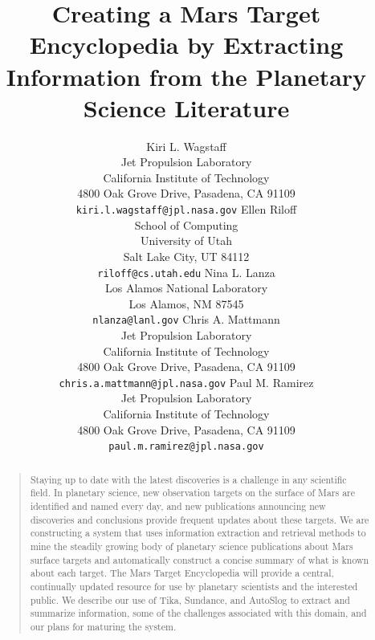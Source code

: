 \documentclass[letterpaper]{article}
\begin{document}
%
\title{Creating a Mars Target Encyclopedia by Extracting Information from
the Planetary Science Literature}
\author{Kiri L. Wagstaff \\
Jet Propulsion Laboratory\\
California Institute of Technology\\
4800 Oak Grove Drive, Pasadena, CA 91109\\
{\tt kiri.l.wagstaff@jpl.nasa.gov}
\And
Ellen Riloff\\
School of Computing\\
University of Utah\\
Salt Lake City, UT 84112\\
{\tt riloff@cs.utah.edu}
\And
Nina L. Lanza\\
Los Alamos National Laboratory \\
Los Alamos, NM  87545\\
{\tt nlanza@lanl.gov}
\AND
Chris A. Mattmann\\ 
\normalsize Jet Propulsion Laboratory\\
\normalsize California Institute of Technology\\
\normalsize 4800 Oak Grove Drive, Pasadena, CA 91109\\
\normalsize {\tt chris.a.mattmann@jpl.nasa.gov}
\And
Paul M. Ramirez\\
\normalsize Jet Propulsion Laboratory\\
\normalsize California Institute of Technology\\
\normalsize 4800 Oak Grove Drive, Pasadena, CA 91109\\
\normalsize {\tt paul.m.ramirez@jpl.nasa.gov}
}
\maketitle
\begin{abstract}
\begin{quote}
Staying up to date with the latest discoveries is a challenge in any
scientific field.  In planetary science, new observation targets on
the surface of Mars are identified and named every day, and new
publications announcing new discoveries and conclusions provide
frequent updates about these targets.
%
We are constructing a system that uses information extraction and
retrieval methods to mine the steadily growing body of planetary
science publications about Mars surface targets and automatically
construct a concise summary of what is known about each target.  The
Mars Target Encyclopedia will provide a central, continually updated
resource for use by planetary scientists and the interested public.
We describe our use of Tika, Sundance, and AutoSlog to extract and
summarize information, some of the challenges associated with this
domain, and our plans for maturing the system.
\end{quote}
\end{abstract}
\end{document}
